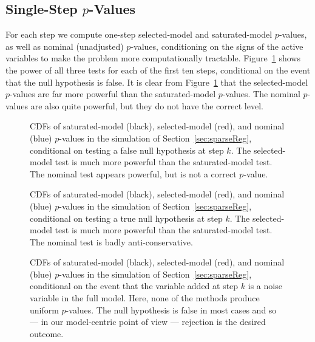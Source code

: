 \documentclass{article}
\begin{document}
\subsection{Single-Step $p$-Values}

For each step we compute one-step selected-model and saturated-model $p$-values, as well as nominal (unadjusted) $p$-values, conditioning on the signs of the active variables to make the problem more computationally tractable. Figure~\ref{fig:simulation_null_false} shows the power of all three tests for each of the first ten steps, conditional on the event that the null hypothesis is false. It is clear from Figure~\ref{fig:simulation_null_false} that the selected-model $p$-values are far more powerful than the saturated-model $p$-values. The nominal $p$-values are also quite powerful, but they do not have the correct level.

\begin{figure}
  \centering
  \caption{CDFs of saturated-model (black), selected-model (red), and nominal (blue) $p$-values in the simulation of Section~\ref{sec:sparseReg}, conditional on testing a false null hypothesis at step $k$. The selected-model test is much more powerful than the saturated-model test. The nominal test appears powerful, but is not a correct $p$-value.}
  \label{fig:simulation_null_false}
\end{figure}

\begin{figure}
  \centering
  \caption{CDFs of saturated-model (black), selected-model (red), and nominal (blue) $p$-values in the simulation of Section~\ref{sec:sparseReg}, conditional on testing a true null hypothesis at step $k$. The selected-model test is much more powerful than the saturated-model test. The nominal test is badly anti-conservative.}
  \label{fig:simulation_null_true}
\end{figure}

\begin{figure}
  \centering
  \caption{CDFs of saturated-model (black), selected-model (red), and nominal (blue) $p$-values in the simulation of Section~\ref{sec:sparseReg}, conditional on the event that the variable added at step $k$ is a noise variable in the full model. Here, none of the methods produce uniform $p$-values. The null hypothesis is false in most cases and so --- in our model-centric point of view --- rejection is the desired outcome.}
  \label{fig:simulation_noise_var}
\end{figure}
\end{document}
